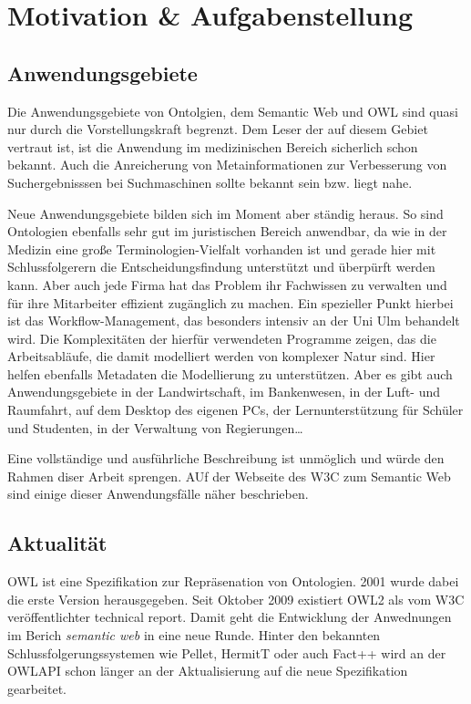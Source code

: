\chapter{Motivation & Aufgabenstellung}
\label{kapitel-motivation}

\section{Anwendungsgebiete}
Die Anwendungsgebiete von Ontolgien, dem Semantic Web und OWL sind quasi nur durch die Vorstellungskraft begrenzt. Dem Leser der auf diesem Gebiet vertraut ist, ist die Anwendung im medizinischen Bereich sicherlich schon bekannt. Auch die Anreicherung von Metainformationen zur Verbesserung von Suchergebnisssen bei Suchmaschinen sollte bekannt sein bzw. liegt nahe.

Neue Anwendungsgebiete bilden sich im Moment aber ständig heraus. So sind Ontologien ebenfalls sehr gut im juristischen Bereich anwendbar, da wie in der Medizin eine große Terminologien-Vielfalt vorhanden ist und gerade hier mit Schlussfolgerern die Entscheidungsfindung unterstützt und überpürft werden kann.
Aber auch jede Firma hat das Problem ihr Fachwissen zu verwalten und für ihre Mitarbeiter effizient zugänglich zu machen. Ein spezieller Punkt hierbei ist das Workflow-Management, das besonders intensiv an der Uni Ulm behandelt wird. Die Komplexitäten der hierfür verwendeten Programme zeigen, das die Arbeitsabläufe, die damit modelliert werden von komplexer Natur sind. Hier helfen ebenfalls Metadaten die Modellierung zu unterstützen.
Aber es gibt auch Anwendungsgebiete in der Landwirtschaft, im Bankenwesen, in der Luft- und Raumfahrt, auf dem Desktop des eigenen PCs, der Lernunterstützung für Schüler und Studenten, in der Verwaltung von Regierungen\ldots

Eine vollständige und ausführliche Beschreibung ist unmöglich und würde den Rahmen diser Arbeit sprengen. AUf der Webseite des W3C zum Semantic Web \cite{W3CUseCases} sind einige dieser Anwendungsfälle näher beschrieben.



\section{Aktualität}
OWL ist eine Spezifikation zur Repräsenation von Ontologien. 2001 wurde dabei die erste Version herausgegeben. Seit Oktober 2009 existiert OWL2 als vom W3C veröffentlichter technical report. Damit geht die Entwicklung der Anwednungen im Berich \emph{semantic web} in eine neue Runde. Hinter den bekannten Schlussfolgerungssystemen wie Pellet, HermitT oder auch Fact++ wird an der OWLAPI schon länger an der Aktualisierung auf die neue Spezifikation gearbeitet.

